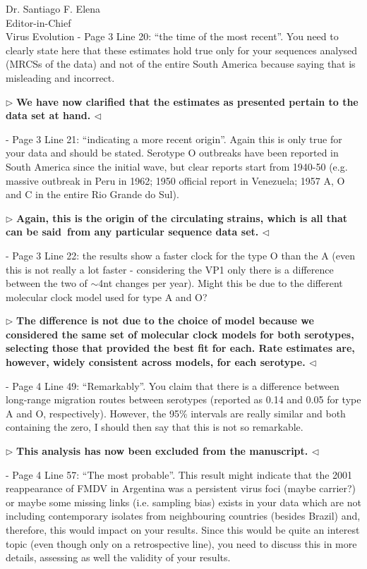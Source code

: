 \documentclass[12pt, a4paper]{letter} %
\newenvironment{reply}{$\triangleright$\bf}{$\triangleleft$}
\begin{document}
\begin{letter}{
	Dr. Santiago F. Elena\\
    Editor-in-Chief \\
    Virus Evolution
}
-       Page 3 Line 20: ``the time of the most recent''. 
You need to clearly state here that these estimates hold true only for your sequences analysed (MRCSs of the data) and not of the entire South America because saying that is misleading and incorrect.

\begin{reply}
We have now clarified that the estimates as presented pertain to the data set at hand.
\end{reply}

-       Page 3 Line 21: ``indicating a more recent origin''. 
Again this is only true for your data and should be stated. 
Serotype O outbreaks have been reported in South America since the initial wave, but clear reports start from 1940-50 (e.g. massive outbreak in Peru in 1962; 1950 official report in Venezuela; 1957 A, O and C in the entire Rio Grande do Sul).

\begin{reply}
Again, this is the origin of the circulating strains, which is all that can be said~\textbf{from any particular sequence data set}.
\end{reply}

-       Page 3 Line 22: the results show a faster clock for the type O than the A (even this is not really a lot faster - considering the VP1 only there is a difference between the two of $\sim$4nt changes per year). 
Might this be due to the different molecular clock model used for type A and O?

\begin{reply}
The difference is not due to the choice of model because we considered the same set of molecular clock models for both serotypes, selecting those that provided the best fit for each.
Rate estimates are, however, widely consistent across models, for each serotype.
\end{reply}

-       Page 4 Line 49: ``Remarkably''. 
You claim that there is a difference between long-range migration routes between serotypes (reported as 0.14 and 0.05 for type A and O, respectively). 
However, the 95\% intervals are really similar and both containing the zero, I should then say that this is not so remarkable.

\begin{reply}
This analysis has now been excluded from the manuscript.
\end{reply}

-       Page 4 Line 57: ``The most probable''. 
This result might indicate that the 2001 reappearance of FMDV in Argentina was a persistent virus foci (maybe carrier?) or maybe some missing links (i.e. sampling bias) exists in your data which are not including contemporary isolates from neighbouring countries (besides Brazil) and, therefore, this would impact on your results. 
Since this would be quite an interest topic (even though only on a retrospective line), you need to discuss this in more details, assessing as well the validity of your results.


\end{letter}
\end{document}
